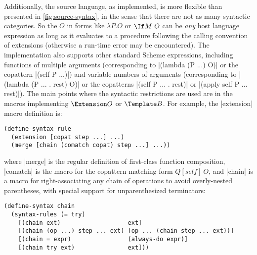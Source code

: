 Additionally, the source language, as implemented, is more flexible than presented in \cref{fig:source-syntax}, in the sense that there are not as many syntactic categories.  
So the $O$ in forms like $\lambda P. O$ or $\If M ~ O$ can be \emph{any} host language expression as long as it evaluates to a procedure following the calling convention of extensions (otherwise a run-time error may be encountered).
The implementation also supports other standard Scheme expressions, including functions of multiple arguments (corresponding to \scm|(lambda (P ...) O)| or the copattern \scm|(self P ...)|) and variable numbers of arguments (corresponding to \scm|(lambda (P ... . rest) O)| or the copatterns \scm|(self P ... . rest)| or \scm|(apply self P ... rest)|).
The main points where the syntactic restrictions are used are in the macros implementing $\Extension O$ or $\Template B$.
For example, the \scm|extension| macro definition is:
\begin{verbatim}
(define-syntax-rule
  (extension [copat step ...] ...)
  (merge [chain (comatch copat) step ...] ...))
\end{verbatim}
where \scm|merge| is the regular definition of first-class function composition, \scm|comatch| is the macro for the copattern matching form $Q[self] ~ O$, and \scm|chain| is a macro for right-associating any chain of operations to avoid overly-nested parentheses, with special support for unparenthesized terminators:
\begin{verbatim}
(define-syntax chain
  (syntax-rules (= try)
    [(chain ext)                   ext]
    [(chain (op ...) step ... ext) (op ... (chain step ... ext))]
    [(chain = expr)                (always-do expr)]
    [(chain try ext)               ext]))
\end{verbatim}

